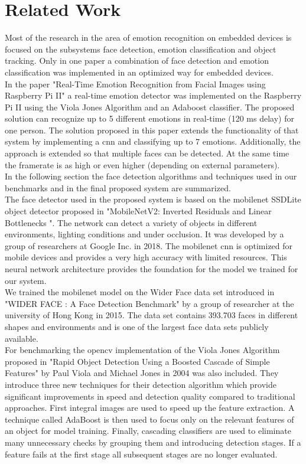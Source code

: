 \chapter{Related Work}
Most of the research in the area of emotion recognition on embedded devices is focused on the subsystems face detection, emotion classification and object tracking. Only in one paper a combination of face detection and emotion classification was implemented in an optimized way for embedded devices.\\
In the paper "Real-Time Emotion Recognition from Facial Images using Raspberry Pi II" \cite{raspberry2} a real-time emotion detector was implemented on the Raspberry Pi II using the Viola Jones Algorithm and an Adaboost classifier. The proposed solution can recognize up to 5 different emotions in real-time (120 ms delay) for one person. The solution proposed in this paper extends the functionality of that system by implementing a \gls{cnn} and classifying up to 7 emotions. Additionally, the approach is extended so that multiple faces can be detected. At the same time the framerate is as high or even higher (depending on external parameters).\\
In the following section the face detection algorithms and techniques used in our benchmarks and in the final proposed system are summarized.\\ 
The face detector used in the proposed system is based on the \gls{mobilenet} SSDLite object detector proposed in "MobileNetV2: Inverted Residuals and Linear Bottlenecks
"\cite{mobilenet}. The network can detect a variety of objects in different environments, lighting conditions and under occlusion. It was developed by a group of researchers at Google Inc. in 2018. The \gls{mobilenet} \gls{cnn} is optimized for mobile devices and provides a very high accuracy with limited resources. This neural network architecture provides the foundation for the model we trained for our system.\\
We trained the \gls{mobilenet} model on the Wider Face data set introduced in "WIDER FACE : A Face Detection Benchmark"\cite{widerface} by a group of researcher at the university of Hong Kong in 2015. The data set contains 393.703 faces in different shapes and environments and is one of the largest face data sets publicly available.\\
For benchmarking the \gls{opencv} implementation of the Viola Jones Algorithm proposed in "Rapid Object Detection Using a Boosted Cascade of Simple Features"\cite{cascade} by Paul Viola and Michael Jones in 2004 was also included. They introduce three new techniques for their detection algorithm which provide significant improvements in speed and detection quality compared to traditional approaches. First integral images are used to speed up the feature extraction. A technique called AdaBoost is then used to focus only on the relevant features of an object for model training. Finally, cascading classifiers are used to eliminate many unnecessary checks by grouping them and introducing detection stages. If a feature fails at the first stage all subsequent stages are no longer evaluated.\\
